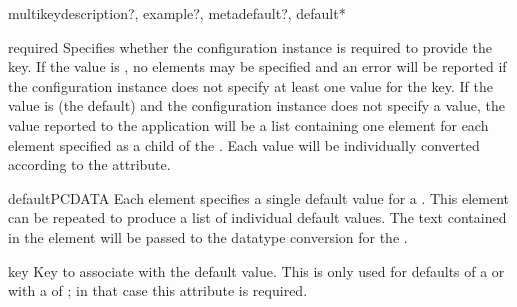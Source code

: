 \documentclass{howto}
\begin{document}
\begin{elementdesc}{multikey}{description?, example?, metadefault?, default*}
  \begin{attributedesc}{required}{}
    Specifies whether the configuration instance is required to
    provide the key.  If the value is , no 
    elements may be specified and an error will be reported if the
    configuration instance does not specify at least one value for the
    key.  If the value is  (the default) and the
    configuration instance does not specify a value, the value
    reported to the application will be a list containing one element
    for each  element specified as a child of the
    .  Each value will be individually converted
    according to the  attribute.
  \end{attributedesc}
\end{elementdesc}


\begin{elementdesc}{default}{PCDATA}
  Each  element specifies a single default value for
  a .  This element can be repeated to produce a
  list of individual default values.  The text contained in the
  element will be passed to the datatype conversion for the
  .

  \begin{attributedesc}{key}{}
    Key to associate with the default value.  This is only used for
    defaults of a  or  with a
     of \code{+}; in that case this attribute is
    required.
  \end{attributedesc}
\end{elementdesc}
\end{document}
